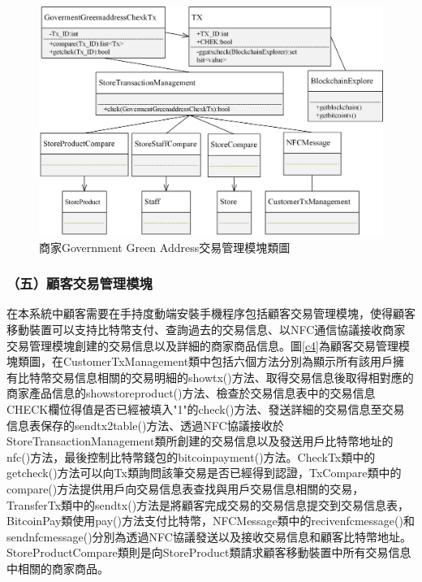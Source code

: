	

	\begin{figure}[!htbp]
		\centering
		\includegraphics[width = 1\textwidth]{c7.jpg}
		\caption{商家Government Green Address交易管理模塊類圖}\label{c7}
	\end{figure}



\subsubsection{（五）顧客交易管理模塊}
在本系統中顧客需要在手持度動端安裝手機程序包括顧客交易管理模塊，使得顧客移動裝置可以支持比特幣支付、查詢過去的交易信息、以NFC通信協議接收商家交易管理模塊創建的交易信息以及詳細的商家商品信息。圖\ref{c4}為顧客交易管理模塊類圖，在CustomerTxManagement類中包括六個方法分別為顯示所有該用戶擁有比特幣交易信息相關的交易明細的showtx()方法、取得交易信息後取得相對應的商家產品信息的showstoreproduct()方法、檢查於交易信息表中的交易信息CHECK欄位得值是否已經被填入"1"的check()方法、發送詳細的交易信息至交易信息表保存的sendtx2table()方法、透過NFC協議接收於StoreTransactionManagement類所創建的交易信息以及發送用戶比特幣地址的nfc()方法，最後控制比特幣錢包的bitcoinpayment()方法。CheckTx類中的getcheck()方法可以向Tx類詢問該筆交易是否已經得到認證，TxCompare類中的compare()方法提供用戶向交易信息表查找與用戶交易信息相關的交易，TransferTx類中的sendtx()方法是將顧客完成交易的交易信息提交到交易信息表，BitcoinPay類使用pay()方法支付比特幣，NFCMessage類中的recivenfcmessage()和sendnfcmessage()分別為透過NFC協議發送以及接收交易信息和顧客比特幣地址。StoreProductCompare類則是向StoreProduct類請求顧客移動裝置中所有交易信息中相關的商家商品。

